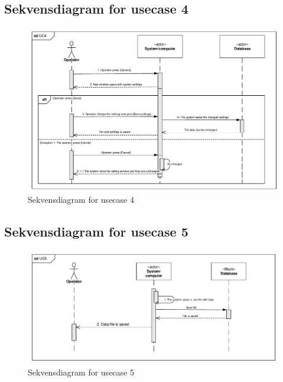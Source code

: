 \subsection{Sekvensdiagram for usecase 4} 
\begin{figure}[H]
	\centering
	\includegraphics[width=1\textwidth]{pdf/UC4_cropped.pdf}
	\caption{Sekvensdiagram for usecase 4}
	\label{fig:uc1}
\end{figure}

\subsection{Sekvensdiagram for usecase 5} 
\begin{figure}[H]
	\centering
	\includegraphics[width=1\textwidth]{pdf/UC5_cropped}
	\caption{Sekvensdiagram for usecase 5}
	\label{fig:uc1}
\end{figure}
